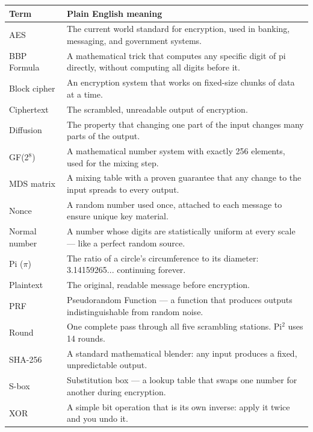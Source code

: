 \documentclass[12pt, a4paper]{article}
\begin{document}
\renewcommand{\arraystretch}{1.6}
\begin{tabular}{p{3.5cm}p{9.5cm}}
\toprule
\textbf{Term} & \textbf{Plain English meaning} \\
\midrule
AES & The current world standard for encryption, used in banking, messaging, and government systems. \\
BBP Formula & A mathematical trick that computes any specific digit of pi directly, without computing all digits before it. \\
Block cipher & An encryption system that works on fixed-size chunks of data at a time. \\
Ciphertext & The scrambled, unreadable output of encryption. \\
Diffusion & The property that changing one part of the input changes many parts of the output. \\
GF(2$^8$) & A mathematical number system with exactly 256 elements, used for the mixing step. \\
MDS matrix & A mixing table with a proven guarantee that any change to the input spreads to every output. \\
Nonce & A random number used once, attached to each message to ensure unique key material. \\
Normal number & A number whose digits are statistically uniform at every scale --- like a perfect random source. \\
Pi ($\pi$) & The ratio of a circle's circumference to its diameter: 3.14159265... continuing forever. \\
Plaintext & The original, readable message before encryption. \\
PRF & Pseudorandom Function --- a function that produces outputs indistinguishable from random noise. \\
Round & One complete pass through all five scrambling stations. Pi$^2$ uses 14 rounds. \\
SHA-256 & A standard mathematical blender: any input produces a fixed, unpredictable output. \\
S-box & Substitution box --- a lookup table that swaps one number for another during encryption. \\
XOR & A simple bit operation that is its own inverse: apply it twice and you undo it. \\
\bottomrule
\end{tabular}
\end{document}
